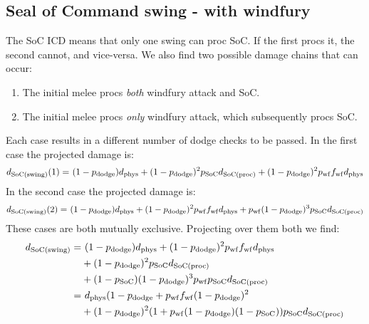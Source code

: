 \subsection{Seal of Command swing - with windfury}
The SoC ICD means that only one swing can proc SoC.
If the first procs it, the second cannot, and vice-versa.
We also find two possible damage chains that can occur:
\begin{enumerate}
	\item The initial melee procs \emph{both} windfury attack and SoC.
	\item The initial melee procs \emph{only} windfury attack, which subsequently procs SoC.
\end{enumerate}
Each case results in a different number of dodge checks to be passed.
In the first case the projected damage is:
\begin{equation*}
	\begin{aligned}
		d_\mathrm{SoC(swing)}  (1) =&~ (1-p_{\mathrm{dodge}} ) d_{\mathrm{phys}}  + (1-p_{\mathrm{dodge}} )^2 p_\mathrm{SoC}  d_\mathrm{SoC(proc)}  + (1-p_{\mathrm{dodge}} )^2 p_{\mathrm{wf}}  f_{\mathrm{wf}}  d_{\mathrm{phys}} \\
	\end{aligned}
\end{equation*}
In the second case the projected damage is:
\begin{equation*}
	\begin{aligned}
		d_\mathrm{SoC(swing)}  (2) =&~ (1-p_{\mathrm{dodge}} ) d_{\mathrm{phys}}  + (1-p_{\mathrm{dodge}} )^2 p_{\mathrm{wf}}  f_{\mathrm{wf}}  d_{\mathrm{phys}}  + p_{\mathrm{wf}}  (1-p_{\mathrm{dodge}} )^3 p_\mathrm{SoC}  d_\mathrm{SoC(proc)} \\
	\end{aligned}
\end{equation*}
These cases are both mutually exclusive. Projecting over them both we find:
\begin{equation*}
	\begin{aligned}
		d_\mathrm{SoC(swing)}  =&~ (1-p_{\mathrm{dodge}} ) d_{\mathrm{phys}}  + (1-p_{\mathrm{dodge}} )^2 p_{\mathrm{wf}}  f_{\mathrm{wf}}  d_{\mathrm{phys}}  \\
		&+ (1-p_{\mathrm{dodge}} )^2 p_\mathrm{SoC}  d_\mathrm{SoC(proc)}  \\
		&+ (1-p_\mathrm{SoC}  )(1-p_{\mathrm{dodge}} )^3 p_{\mathrm{wf}}  p_\mathrm{SoC}   d_\mathrm{SoC(proc)}  \\
		=&~  d_{\mathrm{phys}} (1 - p_{\mathrm{dodge}}  + p_{\mathrm{wf}} f_{\mathrm{wf}} (1 -p_{\mathrm{dodge}} )^2 \\
		&+ (1-p_{\mathrm{dodge}} )^2 (1+p_{\mathrm{wf}} (1-p_{\mathrm{dodge}} )(1-p_\mathrm{SoC}  )) p_\mathrm{SoC}  d_\mathrm{SoC(proc)}  
	\end{aligned}
\end{equation*}




